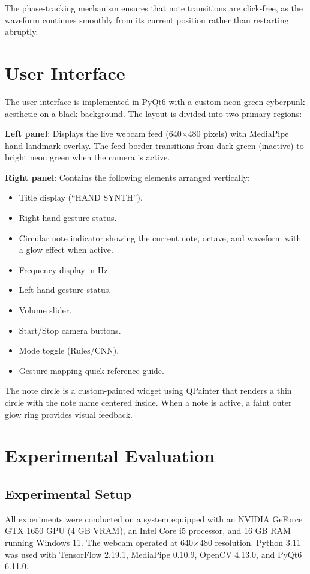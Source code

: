 \documentclass[conference]{IEEEtran}
\begin{document}
The phase-tracking mechanism ensures that note transitions are click-free, as the waveform continues smoothly from its current position rather than restarting abruptly.

\section{User Interface}

The user interface is implemented in PyQt6 with a custom neon-green cyberpunk aesthetic on a black background. The layout is divided into two primary regions:

\textbf{Left panel}: Displays the live webcam feed (640$\times$480 pixels) with MediaPipe hand landmark overlay. The feed border transitions from dark green (inactive) to bright neon green when the camera is active.

\textbf{Right panel}: Contains the following elements arranged vertically:
\begin{itemize}
\item Title display (``HAND SYNTH'').
\item Right hand gesture status.
\item Circular note indicator showing the current note, octave, and waveform with a glow effect when active.
\item Frequency display in Hz.
\item Left hand gesture status.
\item Volume slider.
\item Start/Stop camera buttons.
\item Mode toggle (Rules/CNN).
\item Gesture mapping quick-reference guide.
\end{itemize}

The note circle is a custom-painted widget using QPainter that renders a thin circle with the note name centered inside. When a note is active, a faint outer glow ring provides visual feedback.

\section{Experimental Evaluation}

\subsection{Experimental Setup}

All experiments were conducted on a system equipped with an NVIDIA GeForce GTX 1650 GPU (4 GB VRAM), an Intel Core i5 processor, and 16 GB RAM running Windows 11. The webcam operated at 640$\times$480 resolution. Python 3.11 was used with TensorFlow 2.19.1, MediaPipe 0.10.9, OpenCV 4.13.0, and PyQt6 6.11.0.
\end{document}

